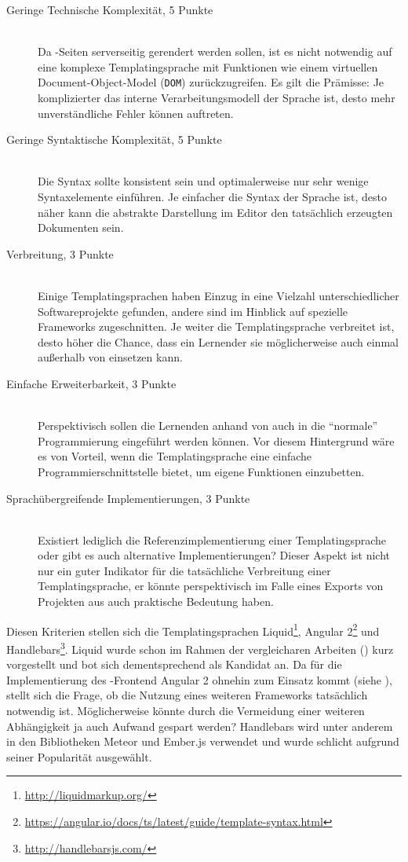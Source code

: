 \begin{description}
\item[Geringe Technische Komplexität, 5 Punkte] \hfill \\
  Da \idename{}-Seiten serverseitig gerendert werden sollen, ist es nicht notwendig auf eine komplexe Templatingsprache mit Funktionen wie einem virtuellen Document-Object-Model (\texttt{DOM}) zurückzugreifen. Es gilt die Prämisse: Je komplizierter das interne Verarbeitungsmodell der Sprache ist, desto mehr unverständliche Fehler können auftreten.
\item[Geringe Syntaktische Komplexität, 5 Punkte] \hfill \\
  Die Syntax sollte konsistent sein und optimalerweise nur sehr wenige Syntaxelemente einführen. Je einfacher die Syntax der Sprache ist, desto näher kann die abstrakte Darstellung im Editor den tatsächlich erzeugten Dokumenten sein.
\item[Verbreitung, 3 Punkte] \hfill \\
  Einige Templatingsprachen haben Einzug in eine Vielzahl unterschiedlicher Softwareprojekte gefunden, andere sind im Hinblick auf spezielle Frameworks zugeschnitten. Je weiter die Templatingsprache verbreitet ist, desto höher die Chance, dass ein Lernender sie möglicherweise auch einmal außerhalb von \idename{} einsetzen kann.
\item[Einfache Erweiterbarkeit, 3 Punkte] \hfill \\
  Perspektivisch sollen die Lernenden anhand von \idename{} auch in die "`normale"' Programmierung eingeführt werden können. Vor diesem Hintergrund wäre es von Vorteil, wenn die Templatingsprache eine einfache Programmierschnittstelle bietet, um eigene Funktionen einzubetten.
\item[Sprachübergreifende Implementierungen, 3 Punkte] \hfill \\
  Existiert lediglich die Referenzimplementierung einer Templatingsprache oder gibt es auch alternative Implementierungen? Dieser Aspekt ist nicht nur ein guter Indikator für die tatsächliche Verbreitung einer Templatingsprache, er könnte perspektivisch im Falle eines Exports von Projekten aus \idename{} auch praktische Bedeutung haben.
\end{description}

Diesen Kriterien stellen sich die Templatingsprachen Liquid\footnote{\url{http://liquidmarkup.org/}}, Angular 2\footnote{\url{https://angular.io/docs/ts/latest/guide/template-syntax.html}} und Handlebars\footnote{\url{http://handlebarsjs.com/}}. Liquid wurde schon im Rahmen der vergleicharen Arbeiten () kurz vorgestellt und bot sich dementsprechend als Kandidat an. Da für die Implementierung des \idename{}-Frontend Angular 2 ohnehin zum Einsatz kommt (siehe ), stellt sich die Frage, ob die Nutzung eines weiteren Frameworks tatsächlich notwendig ist. Möglicherweise könnte durch die Vermeidung einer weiteren Abhängigkeit ja auch Aufwand gespart werden? Handlebars wird unter anderem in den Bibliotheken Meteor und Ember.js verwendet und wurde schlicht aufgrund seiner Popularität ausgewählt.

